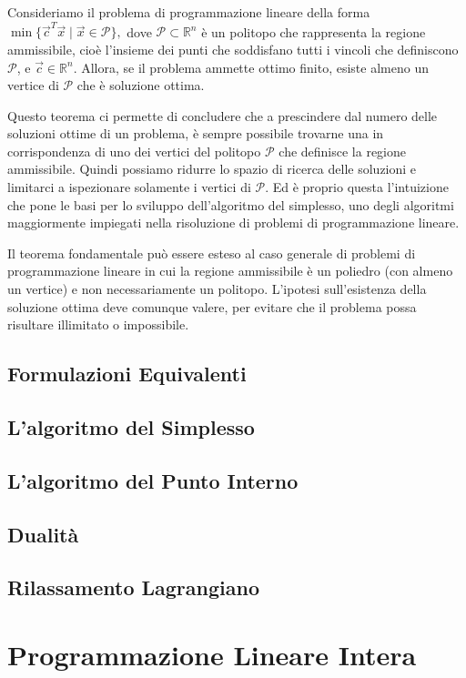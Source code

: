 \begin{LPTheorem}
Consideriamo il problema di programmazione lineare della
forma
\(
    \min \{\vec{c}^T\vec{x} \mid
    \vec{x} \in \mathcal{P} \},
\)
dove $\mathcal{P} \subset \mathbb{R}^n$ è un politopo che rappresenta la
regione ammissibile, cioè l'insieme dei punti che soddisfano tutti i
vincoli che definiscono $\mathcal{P}$, e $\vec{c} \in \mathbb{R}^n$. Allora,
se il problema ammette ottimo finito, esiste almeno un vertice di
$\mathcal{P}$ che è soluzione ottima.
\end{LPTheorem}
Questo teorema ci permette di concludere che a prescindere dal numero delle
soluzioni ottime di un problema, è sempre possibile trovarne una in
corrispondenza di uno dei vertici del politopo $\mathcal{P}$ che definisce
la regione ammissibile. Quindi possiamo ridurre lo spazio di ricerca delle
soluzioni e limitarci a ispezionare solamente i vertici di $\mathcal{P}$.
Ed è proprio questa l'intuizione che pone le basi per lo sviluppo
dell'algoritmo del simplesso, uno degli algoritmi maggiormente impiegati
nella risoluzione di problemi di programmazione lineare.

Il teorema fondamentale può essere esteso al caso generale di problemi di
programmazione lineare in cui la regione ammissibile è un poliedro (con
almeno un vertice) e non necessariamente un politopo. L'ipotesi
sull'esistenza della soluzione ottima deve comunque valere, per evitare che
il problema possa risultare illimitato o impossibile.

\subsection{Formulazioni Equivalenti}
\subsection{L'algoritmo del Simplesso}
\subsection{L'algoritmo del Punto Interno}
\subsection{Dualità}
\subsection{Rilassamento Lagrangiano}

\section{Programmazione Lineare Intera}

